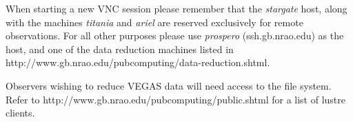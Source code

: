 When starting a new \gls{VNC} session please remember that the \textit{stargate} host,
along with the machines \textit{titania} and \textit{ariel} are reserved
exclusively for remote observations. For all other purposes please use
\textit{prospero} (ssh.gb.nrao.edu) as the host, and one of the data reduction
machines listed in \\
{http://www.gb.nrao.edu/pubcomputing/data-reduction.shtml}.

Observers wishing to reduce VEGAS data will need access to the  file system.
Refer to
{http://www.gb.nrao.edu/pubcomputing/public.shtml} for a list of lustre clients.

